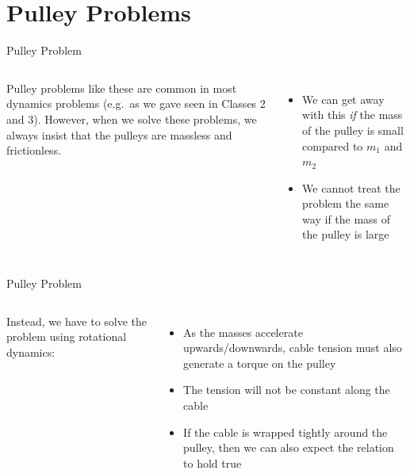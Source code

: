 \documentclass[12pt,compress,aspectratio=169]{beamer}
\begin{document}
\section{Pulley Problems}

\begin{frame}{Pulley Problem}
  \begin{columns}
    \centering
    

    Pulley problems like these are common in most dynamics problems (e.g.\ as
    we gave seen in Classes 2 and 3). However, when we solve these problems, we
    always insist that the pulleys are massless and frictionless.
    \begin{itemize}
    \item We can get away with this \emph{if} the mass of the pulley is small
      compared to $m_1$ and $m_2$
    \item We cannot treat the problem the same way if the mass of the pulley is
      large
    \end{itemize}
  \end{columns}
\end{frame}



\begin{frame}[t]{Pulley Problem}
  \begin{columns}
    \centering
    
    
    Instead, we have to solve the problem using rotational dynamics:
    \begin{itemize}
    \item As the masses accelerate upwards/downwards, cable tension must also
      generate a torque on the pulley
    \item The tension will not be constant along the cable
    \item If the cable is wrapped tightly around the pulley, then we can also
      expect the relation to hold true

    \end{itemize}
  \end{columns}
\end{frame}
\end{document}
